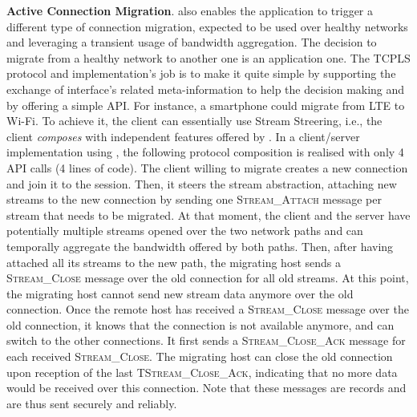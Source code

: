 \textbf{Active Connection Migration}. \tcpls also enables the application
to trigger a different type of connection migration, expected to be used over
healthy networks and leveraging a transient usage of bandwidth aggregation. The
decision to migrate from a healthy network to another one is an application one.
The TCPLS protocol and implementation's job is to make it quite simple by
supporting the exchange of interface's related meta-information to help the decision
making and by offering a simple API.
For instance, a smartphone could migrate from LTE to Wi-Fi.
To achieve it, the client can essentially use Stream Streering, i.e., the client
\textit{composes} with independent
features offered by \tcpls. In a client/server implementation using \tcpls, the
following protocol composition is realised with only 4 API calls (4 lines of
code). The client willing to migrate creates a new \tcp connection and join it to the \tcpls
session. Then, it steers the \tcpls stream abstraction, attaching new streams to the new
connection by sending one \textsc{Stream\_Attach} message per stream that needs
to be migrated. At that moment, the client and the server have potentially
multiple streams opened over the two network paths and can temporally aggregate
the bandwidth offered by both paths. Then, after having attached
all its streams to the new path, the migrating host sends a
\textsc{Stream\_Close} message over the old \tcp connection for all old streams.
At this point, the migrating host cannot send new stream data anymore over the
old connection. Once the remote host has received a \textsc{Stream\_Close}
message over the old \tcp connection, it knows that the connection is not
available anymore, and can switch to the other connections. It first sends a
\textsc{Stream\_Close\_Ack} message for each received \textsc{Stream\_Close}.
The migrating host can close the old connection upon reception of the last
T\textsc{Stream\_Close\_Ack}, indicating that no more data would be received over
this connection. Note that these messages are \tls records and are thus sent
securely and reliably.%

